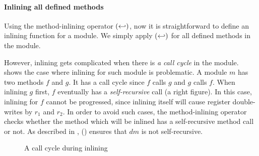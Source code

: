 \paragraph{Inlining all defined methods}

Using the method-inlining operator $(\hookleftarrow)$, now it is
straightforward to define an inlining function for a module. We simply
apply $(\hookleftarrow)$ for all defined methods in the module.

However, inlining gets complicated when there is \emph{a call cycle}
in the module.  shows the case where
inlining for such module is problematic. A module $m$ has two methods
$f$ and $g$. It has a call cycle since $f$ calls $g$ and $g$ calls
$f$. When inlining $g$ first, $f$ eventually has a
\emph{self-recursive} call (a right figure). In this case, inlining
for $f$ cannot be progressed, since inlining itself will cause
register double-writes by $r_1$ and $r_2$. In order to avoid such
cases, the method-inlining operator checks whether the method which
will be inlined has a self-recursive method call or not. As described
in , () ensures that $dm$ is not
self-recursive.

\begin{figure}[t]
  \begin{subfigure}[b]{0.5\textwidth}
  \end{subfigure}
  \begin{subfigure}[b]{0.5\textwidth}
  \end{subfigure}
  \caption{A call cycle during inlining}
  \label{ex-inlining-callcycle}
\end{figure}

